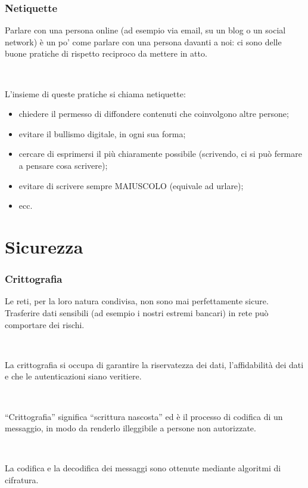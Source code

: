 \documentclass[]{beamer}
\begin{document}
\begin{frame}
\frametitle{Netiquette}
Parlare con una persona online (ad esempio via email, su un blog o un social network) è un po' come parlare con una persona davanti a noi: ci sono delle \alert<1>{buone pratiche} di rispetto reciproco da mettere in atto.\pause

~

L'insieme di queste pratiche si chiama \alert<2->{netiquette}:\pause
\begin{itemize}
  \item chiedere il permesso di diffondere contenuti che coinvolgono altre persone;\pause
  \item evitare il bullismo digitale, in ogni sua forma;\pause
  \item cercare di esprimersi il più chiaramente possibile (scrivendo, ci si può fermare a pensare cosa scrivere);\pause
  \item evitare di scrivere sempre MAIUSCOLO (equivale ad urlare);\pause
  \item ecc.
\end{itemize}
\end{frame}


\section{Sicurezza}


\begin{frame}
\frametitle{Crittografia}
Le reti, per la loro natura condivisa, non sono mai perfettamente sicure. Trasferire dati sensibili (ad esempio i nostri estremi bancari) in rete può comportare dei rischi.\pause

~

La \alert<2>{crittografia} si occupa di garantire la riservatezza dei dati, l'affidabilità dei dati e che le autenticazioni siano veritiere.\pause

~

``Crittografia'' significa ``scrittura nascosta'' ed è il processo di codifica di un messaggio, in modo da renderlo illeggibile a persone non autorizzate.\pause

~

La codifica e la decodifica dei messaggi sono ottenute mediante \alert{algoritmi di cifratura}.
\end{frame}
\end{document}
